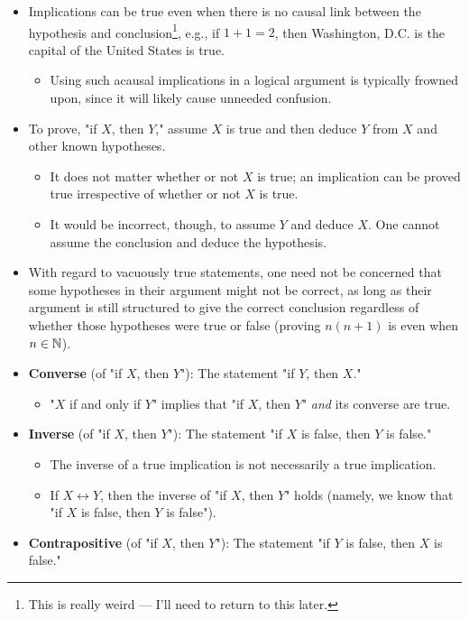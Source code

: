 \documentclass[../main.tex]{subfiles}
\begin{document}
\begin{itemize}
    \item Implications can be true even when there is no causal link between the hypothesis and conclusion\footnote{This is really weird --- I'll need to return to this later.}, e.g., if $1+1=2$, then Washington, D.C. is the capital of the United States is true.
    \begin{itemize}
        \item Using such acausal implications in a logical argument is typically frowned upon, since it will likely cause unneeded confusion.
    \end{itemize}
    \item To prove, "if $X$, then $Y$," assume $X$ is true and then deduce $Y$ from $X$ and other known hypotheses.
    \begin{itemize}
        \item It does not matter whether or not $X$ is true; an implication can be proved true irrespective of whether or not $X$ is true.
        \item It would be incorrect, though, to assume $Y$ and deduce $X$. One cannot assume the conclusion and deduce the hypothesis.
    \end{itemize}
    \item With regard to vacuously true statements, one need not be concerned that some hypotheses in their argument might not be correct, as long as their argument is still structured to give the correct conclusion regardless of whether those hypotheses were true or false (proving $n(n+1)$ is even when $n\in\mathbb{N}$).
    \item \textbf{Converse} (of "if $X$, then $Y$"): The statement "if $Y$, then $X$."
    \begin{itemize}
        \item "$X$ if and only if $Y$" implies that "if $X$, then $Y$" \emph{and} its converse are true.
    \end{itemize}
    \item \textbf{Inverse} (of "if $X$, then $Y$"): The statement "if $X$ is false, then $Y$ is false."
    \begin{itemize}
        \item The inverse of a true implication is not necessarily a true implication.
        \item If $X\leftrightarrow Y$, then the inverse of "if $X$, then $Y$" holds (namely, we know that "if $X$ is false, then $Y$ is false").
    \end{itemize}
    \item \textbf{Contrapositive} (of "if $X$, then $Y$"): The statement "if $Y$ is false, then $X$ is false."

\end{itemize}
\end{document}

